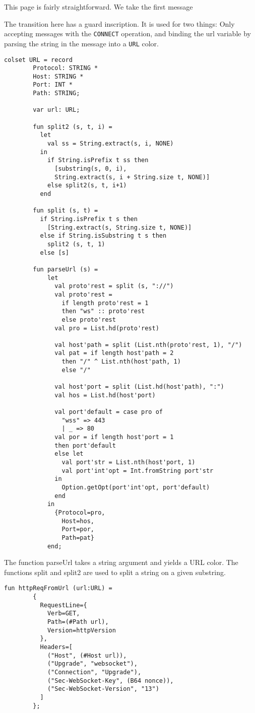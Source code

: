 		This page is fairly straightforward. We take the first message
		
		The transition here has a guard inscription. It is used for two things: Only
		accepting messages with the \lstinline:CONNECT: operation, and binding the url
		variable by parsing the string in the message into a \lstinline:URL: color. 
		
		\begin{lstlisting}[label=lst:url,caption=URL Declarations,gobble=2]
		colset URL = record
		Protocol: STRING *
		Host: STRING *
		Port: INT *
		Path: STRING;
		
		var url: URL;
		
		fun split2 (s, t, i) =
		  let
		    val ss = String.extract(s, i, NONE) 
		  in 
		    if String.isPrefix t ss then
		      [substring(s, 0, i), 
		      String.extract(s, i + String.size t, NONE)]
		    else split2(s, t, i+1)
		  end
		
		fun split (s, t) = 
		  if String.isPrefix t s then
		    [String.extract(s, String.size t, NONE)]
		  else if String.isSubstring t s then
		    split2 (s, t, 1)
		  else [s]
		
		fun parseUrl (s) = 
			let
			  val proto'rest = split (s, "://")
			  val proto'rest = 
			    if length proto'rest = 1 
			    then "ws" :: proto'rest 
			    else proto'rest 
			  val pro = List.hd(proto'rest)
			
			  val host'path = split (List.nth(proto'rest, 1), "/")
			  val pat = if length host'path = 2
			    then "/" ^ List.nth(host'path, 1)
			    else "/"
			  
			  val host'port = split (List.hd(host'path), ":")
			  val hos = List.hd(host'port)
			
			  val port'default = case pro of
			    "wss" => 443
			    | _ => 80
			  val por = if length host'port = 1 
			  then port'default
			  else let
			    val port'str = List.nth(host'port, 1)
			    val port'int'opt = Int.fromString port'str
			  in
			    Option.getOpt(port'int'opt, port'default)
			  end
			in
			  {Protocol=pro, 
			    Host=hos, 
			    Port=por, 
			    Path=pat}
			end;
		\end{lstlisting}
		
		The function parseUrl takes a string argument and yields a URL color. The
		functions split and split2 are used to split a string on a given substring.
		
		
		\begin{lstlisting}[label=lst:httpReqFromUrl,caption=httpReqFromUrl,gobble=2]
		fun httpReqFromUrl (url:URL) = 
		{
		  RequestLine={
		    Verb=GET, 
		    Path=(#Path url),
		    Version=httpVersion
		  },
		  Headers=[
		    ("Host", (#Host url)),
		    ("Upgrade", "websocket"),
		    ("Connection", "Upgrade"),
		    ("Sec-WebSocket-Key", (B64 nonce)),
		    ("Sec-WebSocket-Version", "13")
		  ]
		};
		\end{lstlisting}
		
